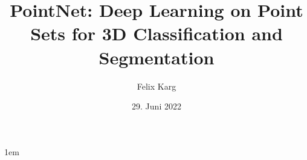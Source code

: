 \usepackage{graphicx}
\usepackage[export]{adjustbox}
\usepackage{multicol}
\usepackage{bibentry}
\usepackage{subcaption}
\usepackage{pdfpcnotes}

\usepackage{xcolor}
\usepackage{caption}
\usepackage[font={small,color=ocre},labelformat=empty]{caption}






\title[PointNet]{PointNet: Deep Learning on Point Sets for 3D Classification and Segmentation}
\author[Felix Karg]{Felix Karg}

\date[29.\,06.\,2022]{29. Juni 2022}


\usepackage[citestyle=alphabetic,bibstyle=numeric,hyperref,backend=biber]{biblatex}



% 
\bibhang1em



\newcommand\blfootnote[1]{%
  \begingroup
  \renewcommand\thefootnote{}\footnote{\color{ocre}#1}%
  \addtocounter{footnote}{-1}%
  \endgroup
}

\newcommand\todo[1]{{\color{red}\textbf{TODO: #1}}}




